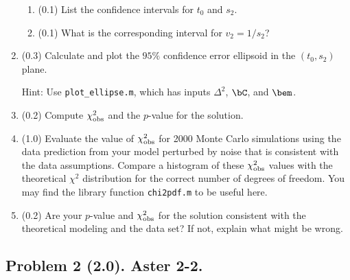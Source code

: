 \documentclass[11pt,titlepage,fleqn]{article}
\begin{document}
\begin{enumerate}
\begin{enumerate}
\item (0.1) List the confidence intervals for $t_0$ and $s_2$.
\item (0.1) What is the corresponding interval for $v_2 = 1/s_2$?
\end{enumerate}

\item (0.3) Calculate and plot the $95\%$ confidence error ellipsoid in the $(t_0, s_2)$ plane.

Hint: Use \verb+plot_ellipse.m+, which has inputs $\Delta^2$, $\bC$, and $\bem$.

\item (0.2) Compute $\chi^2_{\rm obs}$ and the $p$-value for the solution.

\item (1.0) Evaluate the value of $\chi^2_{\rm obs}$ for 2000 Monte Carlo simulations using the data prediction from your model perturbed by noise that is consistent with the data assumptions. Compare a histogram of these $\chi^2_{\rm obs}$ values with the theoretical $\chi^2$ distribution for the correct number of degrees of freedom.
You may find the library function \verb+chi2pdf.m+ to be useful here.

\label{monte}

\item (0.2) Are your $p$-value and $\chi^2_{\rm obs}$ for the solution consistent with the theoretical modeling and the data set? If not, explain what might be wrong.

\end{enumerate}


\subsection*{Problem 2 (2.0). Aster 2-2.}
\end{document}
